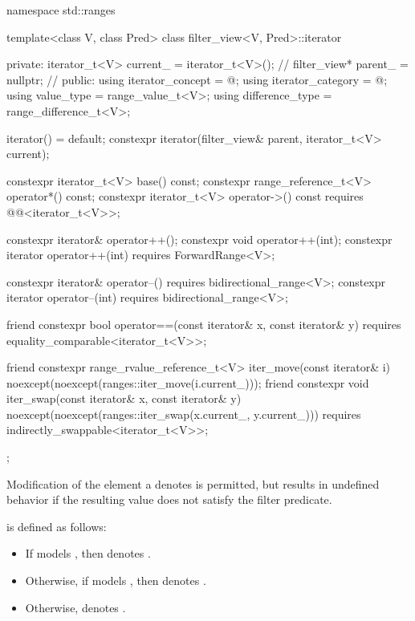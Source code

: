 %
\begin{codeblock}
namespace std::ranges {
  template<class V, class Pred>
  class filter_view<V, Pred>::iterator {
  private:
    iterator_t<V> current_ = iterator_t<V>();   // \expos
    filter_view* parent_ = nullptr;             // \expos
  public:
    using iterator_concept  = @\seebelow@;
    using iterator_category = @\seebelow@;
    using value_type        = range_value_t<V>;
    using difference_type   = range_difference_t<V>;

    iterator() = default;
    constexpr iterator(filter_view& parent, iterator_t<V> current);

    constexpr iterator_t<V> base() const;
    constexpr range_reference_t<V> operator*() const;
    constexpr iterator_t<V> operator->() const
      requires @@<iterator_t<V>>;

    constexpr iterator& operator++();
    constexpr void operator++(int);
    constexpr iterator operator++(int) requires ForwardRange<V>;

    constexpr iterator& operator--() requires bidirectional_range<V>;
    constexpr iterator operator--(int) requires bidirectional_range<V>;

    friend constexpr bool operator==(const iterator& x, const iterator& y)
      requires equality_comparable<iterator_t<V>>;

    friend constexpr range_rvalue_reference_t<V> iter_move(const iterator& i)
      noexcept(noexcept(ranges::iter_move(i.current_)));
    friend constexpr void iter_swap(const iterator& x, const iterator& y)
      noexcept(noexcept(ranges::iter_swap(x.current_, y.current_)))
      requires indirectly_swappable<iterator_t<V>>;
  };
}
\end{codeblock}

\pnum
Modification of the element a  denotes is
permitted, but results in undefined behavior if the resulting value does not
satisfy the filter predicate.

\pnum
{} is defined as follows:
\begin{itemize}
\item If  models , then
 denotes .

\item Otherwise, if  models , then
 denotes .

\item Otherwise,  denotes .
\end{itemize}

